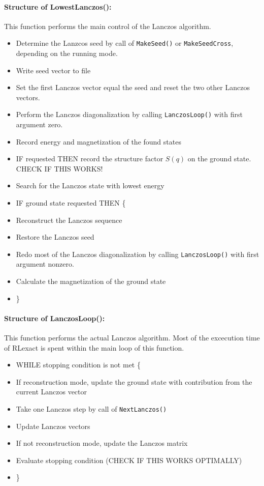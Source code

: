 \documentclass{article}
\begin{document}
\paragraph{Structure of LowestLanczos():} This function performs the main control of the Lanczos algorithm.
\begin{itemize}
\item Determine the Lanzcos seed by call of \verb+MakeSeed()+ or \verb+MakeSeedCross+, depending on the running mode.
\item Write seed vector to file
\item Set the first Lanczos vector equal the seed and reset the two other Lanczos vectors.
\item Perform the Lanczos diagonalization by calling \verb+LanczosLoop()+ with first argument zero.
\item Record energy and magnetization of the found states
\item IF requested THEN record the structure factor $S(q)$ on the ground state. CHECK IF THIS WORKS!
\item Search for the Lanczos state with lowest energy
\item IF ground state requested THEN \{
\item \hspace{5mm} Reconstruct the Lanczos sequence
\item \hspace{5mm} Restore the Lanczos seed
\item \hspace{5mm} Redo most of the Lanczos diagonalization by calling \verb+LanczosLoop()+ with first argument nonzero.
\item \hspace{5mm} Calculate the magnetization of the ground state
\item \}
\end{itemize}

\paragraph{Structure of LanczosLoop():} This function performs the actual Lanczos algorithm. Most of the excecution time of RLexact is spent within the main loop of this function.
\begin{itemize}
\item WHILE stopping condition is not met \{
\item \hspace{5mm} If reconstruction mode, update the ground state with contribution from the current Lanczos vector
\item \hspace{5mm} Take one Lanczos step by call of \verb+NextLanczos()+
\item \hspace{5mm} Update Lanczos vectors 
\item \hspace{5mm} If not reconstruction mode, update the Lanczos matrix
\item \hspace{5mm} Evaluate stopping condition (CHECK IF THIS WORKS OPTIMALLY)
\item \}
\end{itemize}
\end{document}
